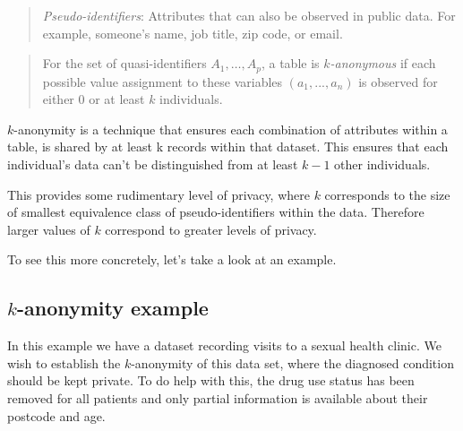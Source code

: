 \documentclass[
  letterpaper,
  DIV=11,
  numbers=noendperiod]{scrreprt}
\begin{document}
\begin{quote}
\emph{Pseudo-identifiers}: Attributes that can also be observed in
public data. For example, someone's name, job title, zip code, or email.
\end{quote}

\begin{quote}
For the set of quasi-identifiers \(A_1, \ldots ,A_p\), a table is
\emph{\(k\)-anonymous} if each possible value assignment to these
variables \((a_1, . . . , a_n)\) is observed for either 0 or at least
\(k\) individuals.
\end{quote}

\(k\)-anonymity is a technique that ensures each combination of
attributes within a table, is shared by at least k records within that
dataset. This ensures that each individual's data can't be distinguished
from at least \(k-1\) other individuals.

This provides some rudimentary level of privacy, where \(k\) corresponds
to the size of smallest equivalence class of pseudo-identifiers within
the data. Therefore larger values of \(k\) correspond to greater levels
of privacy.

To see this more concretely, let's take a look at an example.

\subsection{\texorpdfstring{\(k\)-anonymity
example}{k-anonymity example}}\label{k-anonymity-example}

In this example we have a dataset recording visits to a sexual health
clinic. We wish to establish the \(k\)-anonymity of this data set, where
the diagnosed condition should be kept private. To do help with this,
the drug use status has been removed for all patients and only partial
information is available about their postcode and age.
\end{document}
